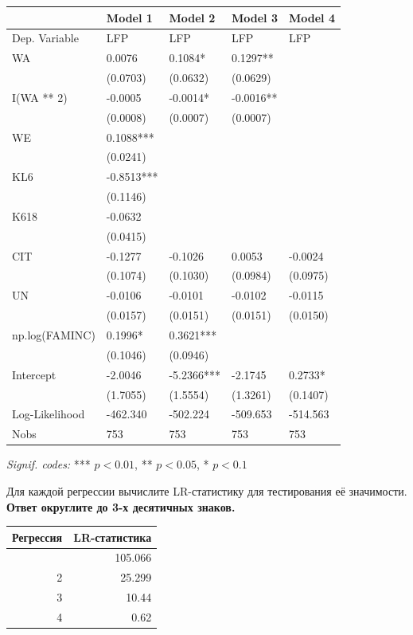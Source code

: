 \documentclass[
  russian,
]{article}
\newcounter{none} %
\begin{document}
{\def\LTcaptype{none} %
\begin{longtable}[]{@{}lllll@{}}
\toprule\noalign{}
& Model 1 & Model 2 & Model 3 & Model 4 \\
\midrule\noalign{}
\endhead
\bottomrule\noalign{}
\endlastfoot
Dep. Variable & LFP & LFP & LFP & LFP \\
WA & 0.0076 & 0.1084* & 0.1297** & \\
& (0.0703) & (0.0632) & (0.0629) & \\
I(WA ** 2) & -0.0005 & -0.0014* & -0.0016** & \\
& (0.0008) & (0.0007) & (0.0007) & \\
WE & 0.1088*** & & & \\
& (0.0241) & & & \\
KL6 & -0.8513*** & & & \\
& (0.1146) & & & \\
K618 & -0.0632 & & & \\
& (0.0415) & & & \\
CIT & -0.1277 & -0.1026 & 0.0053 & -0.0024 \\
& (0.1074) & (0.1030) & (0.0984) & (0.0975) \\
UN & -0.0106 & -0.0101 & -0.0102 & -0.0115 \\
& (0.0157) & (0.0151) & (0.0151) & (0.0150) \\
np.log(FAMINC) & 0.1996* & 0.3621*** & & \\
& (0.1046) & (0.0946) & & \\
Intercept & -2.0046 & -5.2366*** & -2.1745 & 0.2733* \\
& (1.7055) & (1.5554) & (1.3261) & (0.1407) \\
Log-Likelihood & -462.340 & -502.224 & -509.653 & -514.563 \\
Nobs & 753 & 753 & 753 & 753 \\
\end{longtable}
}

\emph{Signif. codes:} *** \(p<0.01\), ** \(p<0.05\), * \(p<0.1\)

Для каждой регрессии вычислите LR-статистику для тестирования её
значимости. \textbf{Ответ округлите до 3-х десятичных знаков.}

{\def\LTcaptype{none} %
\begin{longtable}[]{@{}rr@{}}
\toprule\noalign{}
Регрессия & LR-статистика \\
\midrule\noalign{}
\endhead
\bottomrule\noalign{}
\endlastfoot
1 & 105.066 \\
2 & 25.299 \\
3 & 10.44 \\
4 & 0.62 \\
\end{longtable}
}
\end{document}
